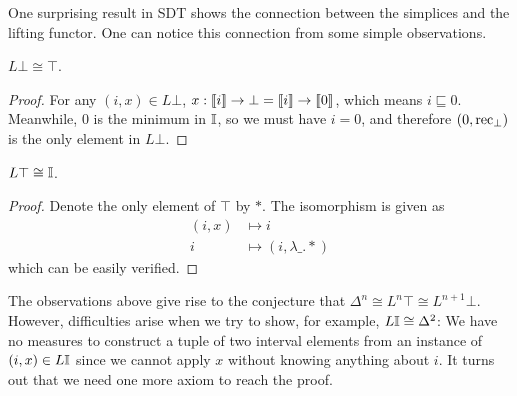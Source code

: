 One surprising result in SDT shows the connection between the simplices and the lifting functor. One can notice this connection from some simple observations.
\begin{lemma}
    \label{lemma-l-delta-0}
    $L\bot\cong\top$.
\end{lemma}
\begin{proof}
    For any $(i,x)\in L\bot$, $x:\left\llbracket i\right\rrbracket\to\bot=\left\llbracket i\right\rrbracket\to\left\llbracket0\right\rrbracket$, which means $i\sqsubseteq0$. Meanwhile, $0$ is the minimum in $\mathbb{I}$, so we must have $i=0$, and therefore $(0,\operatorname{rec}_\bot)$ is the only element in $L\bot$.
\end{proof}
\begin{lemma}
    \label{lemma-l-delta-1}
    $L\top\cong\mathbb{I}$.
\end{lemma}
\begin{proof}
    Denote the only element of $\top$ by $*$. The isomorphism is given as
    $$\begin{aligned}
        (i,x)&\mapsto i \\
        i&\mapsto(i,\lambda\_.*)
    \end{aligned}$$
    which can be easily verified.
\end{proof}
The observations above give rise to the conjecture that $\Delta^n\cong L^n\top\cong L^{n+1}\bot$. However, difficulties arise when we try to show, for example, $L\mathbb{I}\cong\Delta^2$: We have no measures to construct a tuple of two interval elements from an instance of $(i,x)\in L\mathbb{I}$ since we cannot apply $x$ without knowing anything about $i$. It turns out that we need one more axiom to reach the proof.

